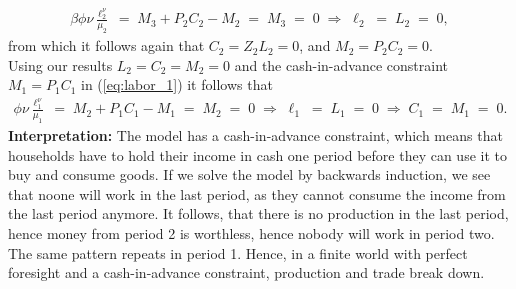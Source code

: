 \documentclass[a4paper, 12pt]{article}
\begin{document}
\begin{Answer}
	\begin{align}%
		\beta \phi \nu \frac{\ell_2^\nu}{\mu_2} \; = \; M_3 + P_2 C_2 - M_2 \; = \; M_3 \; = \; 0 \; \Rightarrow \; \ell_2 \; = \; L_2 \; = \; 0,%
	\end{align}%
	from which it follows again that $C_2 = Z_2 L_2 = 0$, and $M_2 = P_2 C_2 = 0$.\\%
	Using our results $L_2 = C_2 = M_2 = 0$ and the cash-in-advance constraint $M_1 = P_1 C_1$ in (\ref{eq:labor_1}) it follows that%
	\begin{align}%
		\phi \nu \frac{\ell_1^\nu}{\mu_1} \; = \; M_2 + P_1 C_1 - M_1 \; = \; M_2 \; = \; 0 \; \Rightarrow \; \ell_1 \; = \; L_1 \; = \; 0 \; \Rightarrow \; C_1 \; = \; M_1 \; = \; 0.%
	\end{align}%
	\textbf{Interpretation:} The model has a cash-in-advance constraint, which means that households have to hold their income in cash one period before they can use it to buy and consume goods. If we solve the model by backwards induction, we see that noone will work in the last period, as they cannot consume the income from the last period anymore. It follows, that there is no production in the last period, hence money from period 2 is worthless, hence nobody will work in period two. The same pattern repeats in period 1. Hence, in a finite world with perfect foresight and a cash-in-advance constraint, production and trade break down.%
\end{Answer}%
\bigskip%
\end{document}
